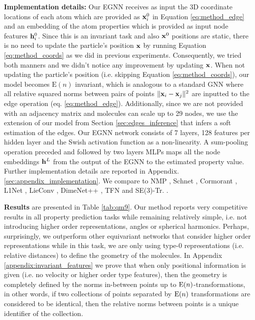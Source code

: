 \textbf{Implementation details:} Our EGNN receives as input the 3D coordinate locations of each atom which are provided as $\mathbf{x}_i^0$ in Equation \ref{eq:method_edge} and an embedding of the atom properties which is provided as input node features $\mathbf{h}_i^0$.  Since this is an invariant task and also $\mathbf{x}^0$ positions are static, there is no need to update the particle's position $\mathbf{x}$ by running Equation \ref{eq:method_coords} as we did in previous experiments. Consequently, we tried both manners and we didn't notice any improvement by updating $\mathbf{x}$. When not updating the particle's position (i.e. skipping Equation \ref{eq:method_coords}), our model becomes $\mathrm{E}(n)$ invariant, which is analogous to a standard GNN where all relative squared norms between pairs of points $\| \mathbf{x}_i - \mathbf{x}_j \|^2$ are inputted to the edge operation (eq. \ref{eq:method_edge}). Additionally, since we are not provided with an adjacency matrix and molecules can scale up to 29 nodes, we use the extension of our model from Section \ref{sec:edges_inference} that infers a soft estimation of the edges. Our EGNN network consists of 7 layers, 128 features per hidden layer and the Swish activation function as a non-linearity. A sum-pooling operation preceded and followed by two layers MLPs maps all the node embeddings $\mathbf{h}^{L}$ from the output of the EGNN to the estimated property value. Further implementation details are reported in Appendix. \ref{sec:appendix_implementation}. We compare to NMP \cite{gilmer2017neural}, Schnet \cite{schutt2017schnet}, Cormorant \cite{anderson2019cormorant}, L1Net \cite{miller2020relevance}, LieConv \cite{finzi2020generalizing}, DimeNet++ \cite{klicpera2020fast}, TFN \cite{thomas2018tensor} and SE(3)-Tr. \cite{fuchs2020se}.

\textbf{Results} are presented in Table \ref{tab:qm9}. Our method reports very competitive results in all property prediction tasks while remaining relatively simple, i.e. not introducing higher order representations, angles or spherical harmonics. %
Perhaps, surprisingly, we outperform other equivariant networks that consider higher order representations while in this task, we are only using type-0 representations (i.e. relative distances) to define the geometry of the molecules. In Appendix \ref{appendix:invariant_features} we prove that when only positional information is given (i.e. no velocity or higher order type features), then the geometry is completely defined by the norms in-between points up to $\mathrm{E}(n)$-transformations, in other words, if two collections of points separated by $\mathrm{E}(n)$ transformations are considered to be identical, then the relative norms between points is a unique identifier of the collection.
